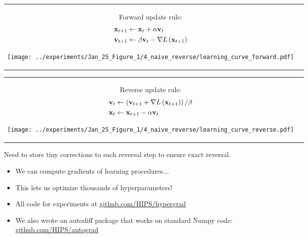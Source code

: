 \documentclass[landscape,a0b,final,a4resizeable]{include/a0poster}
\newcommand{\vv}{\mathbf{v}}
\begin{document}
\begin{poster}
\begin{multicols}{3}
\begin{tabular}{cc}
\begin{minipage}[c]{0.4\columnwidth}
Forward update rule:
{\begin{align*}
\vx_{t+1} & \leftarrow \vx_t + \alpha \vv_t \\
\vv_{t+1} & \leftarrow \beta \vv_t - \nabla L\left(\vx_{t+1}\right)
\end{align*}}
\end{minipage}
\begin{minipage}[c]{0.55\columnwidth}
\begin{center}
\texttt{[image: ../experiments/Jan\_25\_Figure\_1/4\_naive\_reverse/learning\_curve\_forward.pdf]}
\end{center}
\end{minipage}
\end{tabular}


\begin{tabular}{cc}
\begin{minipage}[c]{0.4\columnwidth}
Reverse update rule:
{\begin{align*}
\vv_{t} & \leftarrow \left(\vv_{t+1} + \nabla L\left(\vx_{t+1}\right)\right)/\beta \\
\vx_{t} & \leftarrow \vx_{t+1} - \alpha \vv_t
\end{align*}}
\end{minipage}
\begin{minipage}[c]{0.55\columnwidth}
\begin{center}
\texttt{[image: ../experiments/Jan\_25\_Figure\_1/4\_naive\_reverse/learning\_curve\_reverse.pdf]}
\end{center}
\end{minipage}
\end{tabular}

Need to store tiny corrections to each reversal step to ensure exact reversal.

\vspace{0.5em}


\begin{itemize}
\item We can compute gradients of learning procedures...
\item This lets us optimize thousands of hyperparameters!
\item All code for experiments at \url{github.com/HIPS/hypergrad}
\item We also wrote an autodiff package that works on standard Numpy code:\\ \url{github.com/HIPS/autograd}
\end{itemize}



\end{multicols}
\end{poster}
\end{document}
